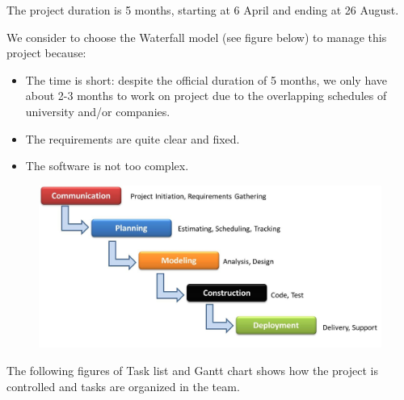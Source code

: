 \documentclass[11pt]{article}
\begin{document}
\par\noindent The project duration is 5 months, starting at 6 April and ending at 26 August.
\par\noindent We consider to choose the Waterfall model (see figure below) to manage this project because: 
\begin{itemize}
\item The time is short: despite the official duration of 5 months, we only have about 2-3 months to work on project due to the overlapping schedules of university and/or companies.
\item The requirements are quite clear and fixed.
\item The software is not too complex.
\end{itemize}
\begin{figure}[H] 
  \includegraphics[width=\linewidth]{P3.jpg}
  \label{fig:wmodel}
\end{figure}
\par\noindent The following figures of Task list and Gantt chart shows how the project is controlled and tasks are organized in the team.
\begin{figure}[H] 
  \label{fig:Tasks}
\end{figure}
\end{document}
